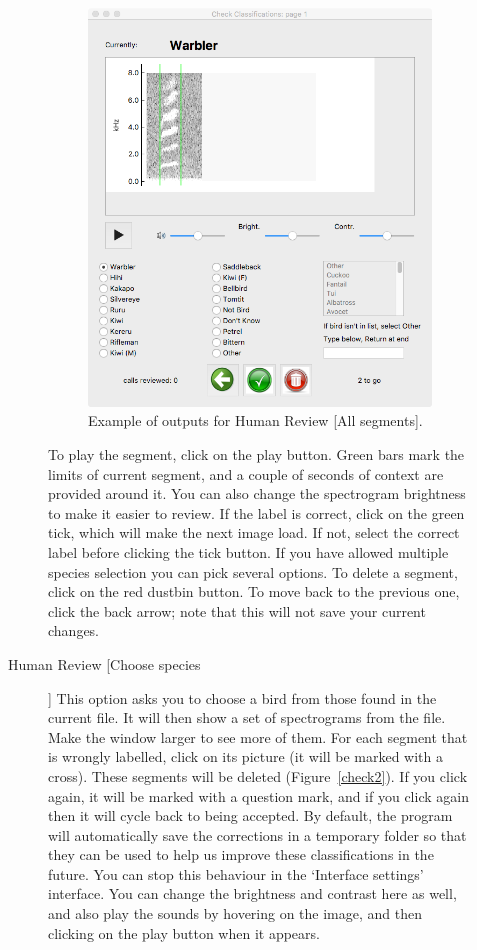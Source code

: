 \documentclass{article}
\begin{document}
\begin{description}
\begin{description}
\begin{figure}
	\includegraphics[width=.6\textwidth]{Figs/review1}
	\caption{Example of outputs for Human Review [All segments].}
	\label{check1}
	\end{figure}
	To play the segment, click on the play button. Green bars mark the limits of current segment, and a couple of seconds of context are provided around it. You can also change the spectrogram brightness to make it easier to review. If the label is correct, click on the green tick, which will make the next image load. If not, select the correct label before clicking the tick button. If you have allowed multiple species selection you can pick several options. To delete a segment, click on the red dustbin button. To move back to the previous one, click the back arrow; note that this will not save your current changes. 
	\item [Human Review [Choose species]] This option asks you to choose a bird from those found in the current file. It will then show a set of spectrograms from the file. Make the window larger to see more of them. For each segment that is wrongly labelled, click on its picture (it will be marked with a cross). These segments will be deleted (Figure~\ref{check2}). If you click again, it will be marked with a question mark, and if you click again then it will cycle back to being accepted. By default, the program will automatically save the corrections in a temporary folder so that they can be used to help us improve these classifications in the future. You can stop this behaviour in the `Interface settings' interface. You can change the brightness and contrast here as well, and also play the sounds by hovering on the image, and then clicking on the play button when it appears. 

\end{description}
\end{description}
\end{document}
